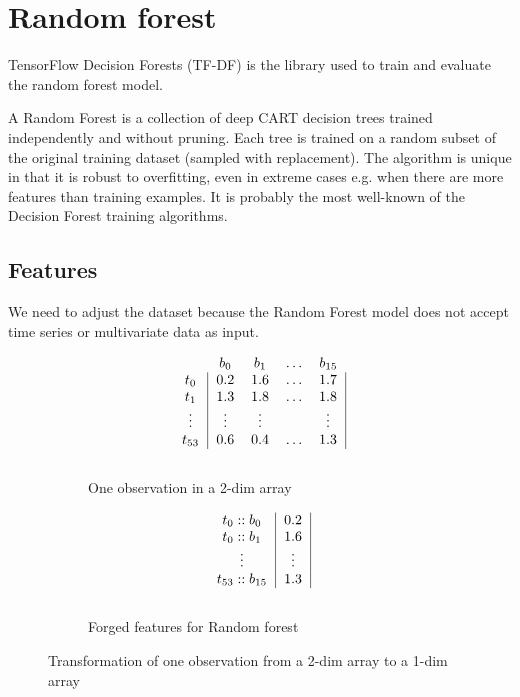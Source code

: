 \section{Random forest}

TensorFlow Decision Forests (TF-DF) \cite{TensorFlow:rf} is the library used to train and evaluate the random forest model.

A Random Forest \cite{breiman2001random} is a collection of deep CART decision trees trained independently and without pruning.
Each tree is trained on a random subset of the original training dataset (sampled with replacement).
The algorithm is unique in that it is robust to overfitting, even in extreme cases e.g. when there are more features than training examples.
It is probably the most well-known of the Decision Forest training algorithms.

\subsection{Features}
We need to adjust the dataset because the Random Forest model does not accept time series or multivariate data as input.

\begin{figure}[H]
  \begin{subfigure}{.49\textwidth}
    \centering
    \[
      \begin{blockarray}{ccccc}
        & b_0 & b_1 & \dots & b_{15} \\
        \begin{block}{c|cccc|}
          t_0 & 0.2 & 1.6 & \dots & 1.7  \\
          t_1 & 1.3 & 1.8 & \dots & 1.8 \\
          \vdots & \vdots & \vdots &  & \vdots   \\
          t_{53} & 0.6 & 0.4 & \dots & 1.3 \\
        \end{block}
      \end{blockarray}
    \]
    \caption{One observation in a 2-dim array}
    \label{fig:figtrans1}
  \end{subfigure}
  \begin{subfigure}{.49\textwidth}
    \centering
    \[
      \begin{blockarray}{cc}
      \begin{block}{c|c|}
        t_0::b_0 & 0.2 \\
        t_0::b_1 & 1.6 \\
        \vdots & \vdots \\
        t_{53}::b_{15} & 1.3 \\
      \end{block}
      \end{blockarray}
    \]
    \caption{Forged features for Random forest}
    \label{fig:figtrans2}
  \end{subfigure}
  \caption{Transformation of one observation from a 2-dim array to a 1-dim array}
  \label{fig:figtrans}
\end{figure}

